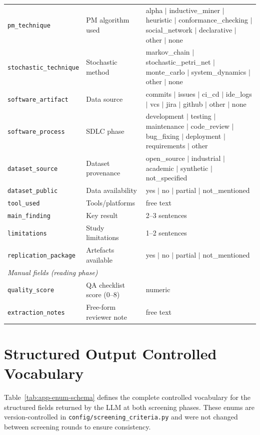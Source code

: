 \begin{table}[htbp]
\begin{tabular}{p{3.2cm} p{4.4cm} p{4.6cm}}
\texttt{pm\_technique}      & PM algorithm used     & alpha $|$ inductive\_miner $|$ heuristic $|$ conformance\_checking $|$ social\_network $|$ declarative $|$ other $|$ none \\
\texttt{stochastic\_technique} & Stochastic method  & markov\_chain $|$ stochastic\_petri\_net $|$ monte\_carlo $|$ system\_dynamics $|$ other $|$ none \\
\texttt{software\_artifact} & Data source           & commits $|$ issues $|$ ci\_cd $|$ ide\_logs $|$ vcs $|$ jira $|$ github $|$ other $|$ none \\
\texttt{software\_process}  & SDLC phase            & development $|$ testing $|$ maintenance $|$ code\_review $|$ bug\_fixing $|$ deployment $|$ requirements $|$ other \\
\texttt{dataset\_source}    & Dataset provenance    & open\_source $|$ industrial $|$ academic $|$ synthetic $|$ not\_specified \\
\texttt{dataset\_public}    & Data availability     & yes $|$ no $|$ partial $|$ not\_mentioned \\
\texttt{tool\_used}         & Tools/platforms       & free text \\
\texttt{main\_finding}      & Key result            & 2--3 sentences \\
\texttt{limitations}        & Study limitations     & 1--2 sentences \\
\texttt{replication\_package} & Artefacts available & yes $|$ no $|$ partial $|$ not\_mentioned \\
\midrule
\multicolumn{3}{l}{\textit{Manual fields (reading phase)}} \\
\texttt{quality\_score}     & QA checklist score (0--8) & numeric \\
\texttt{extraction\_notes}  & Free-form reviewer note   & free text \\
\bottomrule
\end{tabular}
\end{table}

\section{Structured Output Controlled Vocabulary}
\label{app:slr-schema}

Table~\ref{tab:app-enum-schema} defines the complete controlled vocabulary
for the structured fields returned by the LLM at both screening phases.
These enums are version-controlled in \texttt{config/screening\_criteria.py}
and were not changed between screening rounds to ensure consistency.

